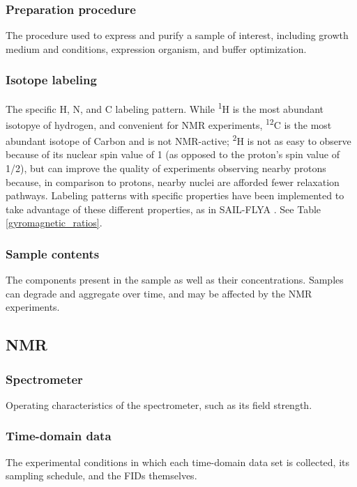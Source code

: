 \subsubsection{Preparation procedure}
The procedure used to express and purify a sample of interest, including
growth medium and conditions, expression organism, and buffer optimization.

\subsubsection{Isotope labeling}
The specific H, N, and C labeling pattern.  While \textsuperscript{1}H is 
the most abundant isotopye of hydrogen, and convenient for NMR experiments,
\textsuperscript{12}C is the most abundant isotope of Carbon and is not 
NMR-active; \textsuperscript{2}H is not as easy to observe because of
its nuclear spin value of 1 (as opposed to the proton's spin value of 1/2),
but can improve the quality of experiments observing nearby protons because,
in comparison to protons, nearby nuclei are afforded fewer relaxation pathways.
Labeling patterns with specific properties have been implemented to take
advantage of these different properties, as in SAIL-FLYA \cite{sail_flya}.
See Table \ref{gyromagnetic_ratios}.

\subsubsection{Sample contents}
The components present in the sample as well as their concentrations.
Samples can degrade and aggregate over time, and may be affected by the
NMR experiments.

\subsection*{NMR}

\subsubsection{Spectrometer}
Operating characteristics of the spectrometer, such as its field strength.

\subsubsection{Time-domain data}
The experimental conditions in which each time-domain data set is collected, 
its sampling schedule, and the FIDs themselves.


